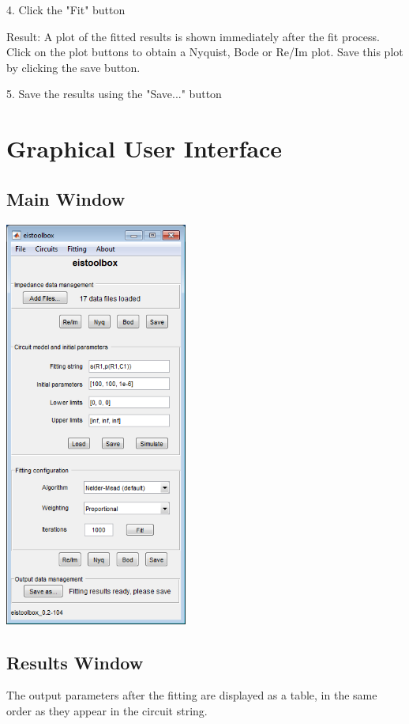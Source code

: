 \documentclass[10pt,b5paper,oneside]{book}
\begin{document}
4. Click the "Fit" button

Result: A plot of the fitted results is shown immediately after the fit process. Click on the plot buttons to obtain a Nyquist, Bode or Re/Im plot. Save this plot by clicking the save button.

5. Save the results using the "Save..." button

\section{Graphical User Interface}

\subsection{Main Window}

\includegraphics[width=6cm]{main_screenshot.png}

\subsection{Results Window}

The output parameters after the fitting are displayed as a table, in the same order as they appear in the circuit string.
\end{document}
